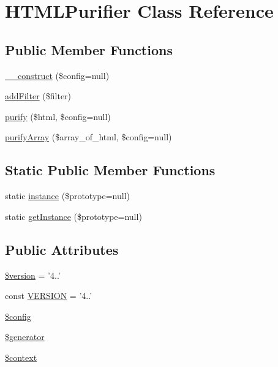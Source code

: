 \hypertarget{classHTMLPurifier}{\section{H\+T\+M\+L\+Purifier Class Reference}
\label{classHTMLPurifier}
}
\subsection*{Public Member Functions}
\begin{DoxyCompactItemize}
\item 
\hyperlink{classHTMLPurifier_aad4cc7dd37f8e30bbdf78c09b81e8b2a}{\+\_\+\+\_\+construct} (\$config=null)
\item 
\hyperlink{classHTMLPurifier_aa857bddec7c98354aa2e6277202e4206}{add\+Filter} (\$filter)
\item 
\hyperlink{classHTMLPurifier_a5b1f6f579594aa52ce4c2dd412d9b249}{purify} (\$html, \$config=null)
\item 
\hyperlink{classHTMLPurifier_a31d7d9b7bde5ec86c462de8b30f87b10}{purify\+Array} (\$array\+\_\+of\+\_\+html, \$config=null)
\end{DoxyCompactItemize}
\subsection*{Static Public Member Functions}
\begin{DoxyCompactItemize}
\item 
static \hyperlink{classHTMLPurifier_a56e73512fe8bbf9d6337e13efed8f78d}{instance} (\$prototype=null)
\item 
static \hyperlink{classHTMLPurifier_a90c1a1d29bd1bd822db48e2005e165aa}{get\+Instance} (\$prototype=null)
\end{DoxyCompactItemize}
\subsection*{Public Attributes}
\begin{DoxyCompactItemize}
\item 
\hyperlink{classHTMLPurifier_a1950375d91cbecb0260bbfc4eca926f0}{\$version} = '4..'
\item 
const \hyperlink{classHTMLPurifier_a0c6a00193ac814390551621656389a67}{V\+E\+R\+S\+I\+O\+N} = '4..'
\item 
\hyperlink{classHTMLPurifier_a0cc1609717991f9ac7a42065f0114c33}{\$config}
\item 
\hyperlink{classHTMLPurifier_ae3fac678235d4807eb71825f5a45d3d8}{\$generator}
\item 
\hyperlink{classHTMLPurifier_a496b488a6ca3bac2684bc876a027a897}{\$context}
\end{DoxyCompactItemize}
